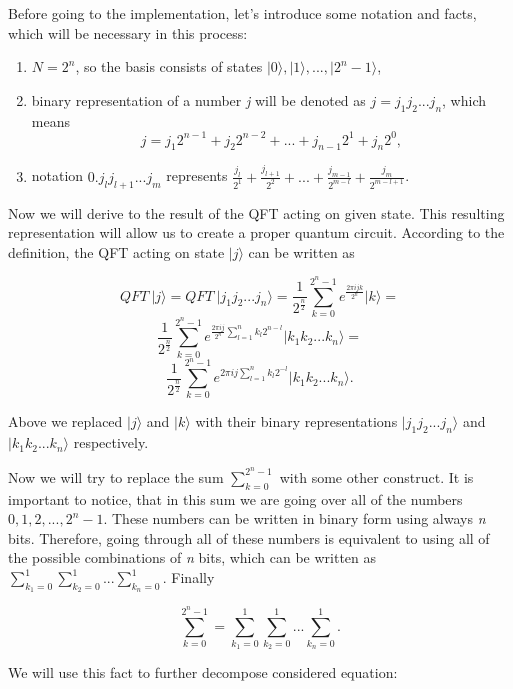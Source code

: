 Before going to the implementation, let's introduce some notation and facts, which will be necessary in this process:

\begin{enumerate}
    \item $N = 2^n$, so the basis consists of states $|0\rangle, |1\rangle, ..., |2^n - 1\rangle$,
    \item binary representation of a number \textit{j} will be denoted as $j = j_1 j_2 ... j_n$, which means
    \[ j = j_1 2^{n - 1} + j_2 2^{n - 2} + ... + j_{n - 1} 2 ^1 + j_n 2^0,\]
    \item notation $0.j_l j_{l+1} ... j_m$ represents $\frac{j_l}{2^1} + \frac{j_{l+1}}{2^2} + ... + \frac{j_{m - 1}}{2^{m - l}} + \frac{j_m}{2^{m - l + 1}}$.
\end{enumerate}

Now we will derive to the result of the QFT acting on given state. This resulting representation will allow us to create a proper quantum circuit. According to the definition, the QFT acting on state $|j\rangle$ can be written as

\[ QFT\ |j\rangle = QFT\ |j_1j_2...j_n\rangle = \frac{1}{2^{\frac{n}{2}}} \sum_{k = 0}^{2^n - 1} e^{\frac{2 \pi ijk}{2^n}} |k\rangle = \]
\[ \frac{1}{2^{\frac{n}{2}}} \sum_{k = 0}^{2^n - 1} e^{\frac{2 \pi ij}{2^n} \sum_{l = 1}^{n}k_l 2^{n - l}} |k_1 k_2 ... k_n\rangle = \]
\[ \frac{1}{2^{\frac{n}{2}}} \sum_{k = 0}^{2^n - 1} e^{2 \pi ij \sum_{l = 1}^{n}k_l 2^{-l}} |k_1 k_2 ... k_n\rangle. \]

Above we replaced $|j\rangle$ and $|k\rangle$ with their binary representations $|j_1j_2...j_n\rangle$ and $|k_1k_2...k_n\rangle$ respectively.

Now we will try to replace the sum $\sum_{k = 0}^{2^n - 1}$ with some other construct. It is important to notice, that in this sum we are going over all of the numbers $0, 1, 2, ..., 2^n - 1$. These numbers can be written in binary form using always \textit{n} bits. Therefore, going through all of these numbers is equivalent to using all of the possible combinations of \textit{n} bits, which can be written as $\sum_{k_1 = 0}^{1}\sum_{k_2 = 0}^{1} ... \sum_{k_n = 0}^{1}$. Finally

\[ \sum_{k = 0}^{2^n - 1} = \sum_{k_1 = 0}^{1} \sum_{k_2 = 0}^{1} ... \sum_{k_n = 0}^{1}.\]

We will use this fact to further decompose considered equation:

